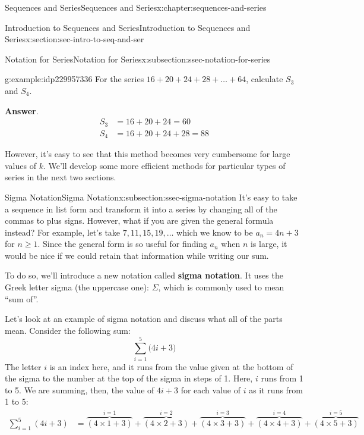 \documentclass[twoside,10pt,]{book}
\newcommand{\blocktitlefont}{\relax}
\newcommand{\terminology}[1]{\textbf{#1}}
\numberwithin{equation}{section}
\newcommand{\amp}{&}
\begin{document}
\begin{chapterptx}{Sequences and Series}{}{Sequences and Series}{}{}{x:chapter:sequences-and-series}
\begin{sectionptx}{Introduction to Sequences and Series}{}{Introduction to Sequences and Series}{}{}{x:section:sec-intro-to-seq-and-ser}
\begin{subsectionptx}{Notation for Series}{}{Notation for Series}{}{}{x:subsection:ssec-notation-for-series}
\begin{example}{}{g:example:idp229957336}
For the series \(16 + 20 + 24 + 28 + \ldots + 64\), calculate \(S_3\) and \(S_4\).\par\smallskip%
\noindent\textbf{\blocktitlefont Answer}.\label{g:answer:idp229958616}{}\hypertarget{g:answer:idp229958616}{}\quad{}%
\begin{align*}
S_3 \amp = 16 + 20 + 24 = 60\\
S_4 \amp = 16 + 20 + 24 + 28 = 88
\end{align*}
\end{example}
%
\par
However, it's easy to see that this method becomes very cumbersome for large values of \(k\).  We'll develop some more efficient methods for particular types of series in the next two sections.%
\end{subsectionptx}
%
%
\typeout{************************************************}
\typeout{************************************************}
%
\begin{subsectionptx}{Sigma Notation}{}{Sigma Notation}{}{}{x:subsection:ssec-sigma-notation}
It's easy to take a sequence in list form and transform it into a series by changing all of the commas to plus signs.  However, what if you are given the general formula instead?  For example, let's take \(7, 11, 15, 19, \ldots\)   which we know to be \({a_n} = 4n + 3\) for \(n \ge 1\).  Since the general form is so useful for finding \(a_n\) when \(n\) is large, it would be nice if we could retain that information while writing our sum.%
\par
To do so, we'll introduce a new notation called \terminology{sigma notation}.  It uses the Greek letter sigma (the uppercase one):  \(\Sigma\), which is commonly used to mean ``sum of''.%
\par
Let's look at an example of sigma notation and discuss what all of the parts mean.  Consider the following sum:%
\begin{equation*}
\sum\limits_{i = 1}^5 {(4i + 3} )
\end{equation*}
The letter \(i\) is an index here, and it runs from the value given at the bottom of the sigma to the number at the top of the sigma in steps of 1.  Here, \(i\) runs from 1 to 5.  We are summing, then, the value of \(4i + 3\) for each value of \(i\) as it runs from 1 to 5:%
\begin{align*}
\sum\limits_{i = 1}^5 {(4i + 3)}  \amp = \overbrace {\left( {4 \times 1 + 3} \right)}^{i = 1} + \overbrace {\left( {4 \times 2 + 3} \right)}^{i = 2} + \overbrace {\left( {4 \times 3 + 3} \right)}^{i = 3} + \overbrace {\left( {4 \times 4 + 3} \right)}^{i = 4} + \overbrace {\left( {4 \times 5 + 3} \right)}^{i = 5}\\

\end{align*}
\end{subsectionptx}
\end{sectionptx}
\end{chapterptx}
\end{document}
